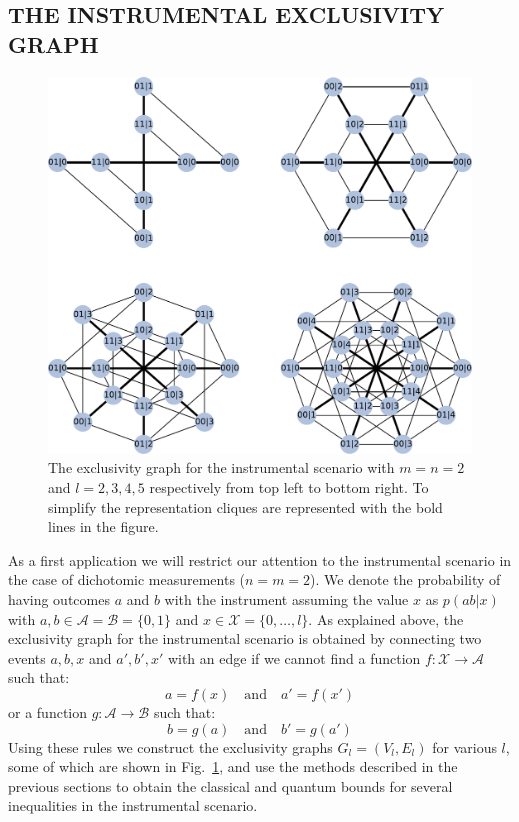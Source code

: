 \documentclass[letterpaper]{article}
\begin{document}
\subsection{THE INSTRUMENTAL EXCLUSIVITY GRAPH}
\begin{figure}[t]
    \centering
    \includegraphics[width=\columnwidth]{images/instrumental_exgraph.pdf}
    \caption{
    The exclusivity graph for the instrumental scenario with $m =
    n =2$ and $l=2,3,4,5$ respectively from top left to bottom right.
    To simplify the representation cliques are represented with the bold
    lines in the figure.}
    \label{fig:instrumental_exgraphs}
\end{figure}

As a first application we will restrict our attention to the instrumental
scenario in the case of dichotomic measurements ($n = m = 2$).  We denote
the probability of having outcomes $a$ and $b$ with the instrument
assuming the value $x$ as $p(ab|x)$ with $a, b \in \mathcal{A} =
\mathcal{B} = \{0,1\}$ and $x \in \mathcal{X} = \{0,\ldots,l\}$.
As explained above, the exclusivity graph for the instrumental scenario
is obtained by connecting two events $a,b,x$ and $a',b',x'$ with an edge
if we cannot find a function $f:\mathcal{X} \rightarrow \mathcal{A}$
such that:
\begin{equation}
    a = f(x) \quad\text{and}\quad a'=f(x')
\end{equation}
or a function $g:\mathcal{A} \rightarrow \mathcal{B}$ such that:
\begin{equation}
     b = g(a) \quad\text{and}\quad b'=g(a')
    \label{eq:non_exclusivity_condition}
\end{equation}
Using these rules we construct the exclusivity graphs $G_l
= (V_l, E_l)$ for various $l$, some of which are shown in
Fig.~\ref{fig:instrumental_exgraphs}, and use the methods described in
the previous sections to obtain the classical and quantum bounds for
several inequalities in the instrumental scenario.
\end{document}
